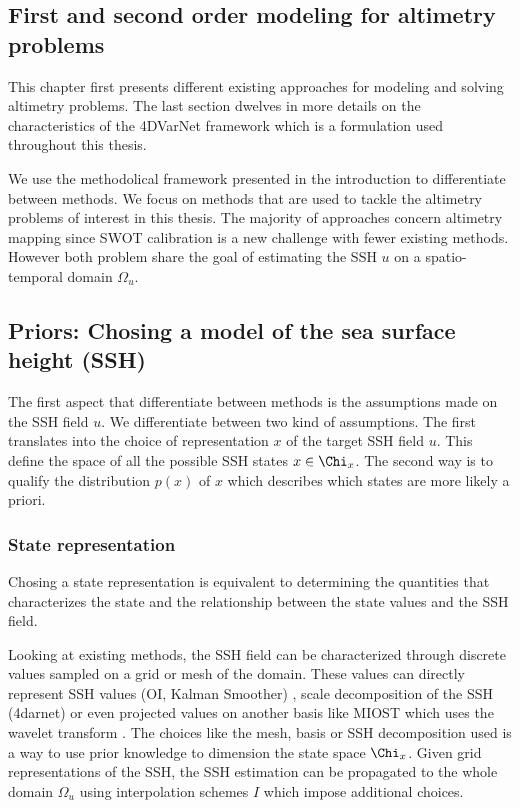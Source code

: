 \begin{bibunit}

  \chapter*{First and second order modeling for altimetry problems}

This chapter first presents different existing approaches for modeling  and solving altimetry problems.
The last section dwelves in more details on the characteristics of the 4DVarNet framework which is a formulation used throughout this thesis.
 
We use the methodolical framework presented in the introduction to differentiate between methods.
  We focus on methods that are used to tackle the altimetry problems of interest in this thesis. The majority of approaches concern altimetry mapping since SWOT calibration is a new challenge with fewer existing methods. However both problem share the goal of estimating the SSH $u$ on a spatio-temporal domain $\Omega_u$.
 
 
\section{Priors: Chosing a model of the sea surface height (SSH)}
The first aspect that differentiate between methods is the assumptions made on the SSH field $u$.
We differentiate between two kind of assumptions.
The first translates into the choice of representation $x$ of the target SSH field $u$. This define the space of all the possible SSH states $x \in \Chi_x$. The second way is to qualify the distribution $p(x)$ of $x$ which describes which states are more likely a priori.


 
  \subsection{State representation}
Chosing a state representation is equivalent to determining the quantities that characterizes the state and the relationship between the state values and the SSH field.


  Looking at existing methods, the SSH field can be characterized through discrete values sampled on a grid or mesh of the domain. These values can directly represent SSH values (OI, Kalman Smoother) \cite{}, scale decomposition of the SSH \cite{}(4darnet) or even projected values on another basis like MIOST \cite{} which uses the wavelet transform \Gamma.
  The choices like the mesh, basis or SSH decomposition used is a way to use prior knowledge to dimension the state space $\Chi_x$. Given grid representations of the SSH, the SSH estimation can be propagated to the whole domain $\Omega_u$ using interpolation schemes $I$ which impose additional choices.


\end{bibunit}
